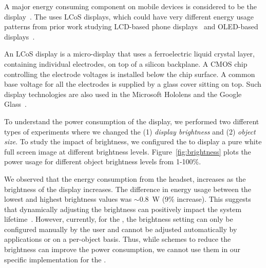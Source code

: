 
A major energy consuming component on mobile devices is considered to be the
display~\cite{187123,Anand:2011}. The {\mlo} uses LCoS displays, which could have very different energy usage patterns from prior work studying LCD-based phone displays~\cite{focus} and OLED-based displays~\cite{focus,focusVR}.

An LCoS display is a micro-display that uses a ferroelectric liquid crystal 
layer, containing individual electrodes, on top of a silicon backplane. A CMOS chip controlling the electrode voltages is installed below the chip surface. A common base voltage for all the electrodes is supplied by a glass cover sitting on top. Such display technologies are also used in the Microsoft Hololens and the Google Glass~\cite{LiKamWa14GGlass}. 

%

To understand the power consumption of the display, we performed two different types of experiments where we changed the
(1) \textit{display brightness} and (2) \textit{object size}. To study the impact of brightness, we configured the {\mlo} to display a pure white full screen image at different brightness levels. Figure~\ref{fig:brightness} plots the power usage for different object brightness levels from 1-100\%. 

We observed that the energy consumption from the headset, increases as the brightness of the display increases. The 
difference in energy usage between the lowest and highest brightness values was $\sim$0.8~W (9\% increase). This suggests that dynamically adjusting
the brightness can positively impact the system lifetime~\cite{focus}. 
However, currently, for the {\mlo}, the brightness setting can only be configured 
manually by the user and cannot be adjusted automatically by applications or on a per-object basis. Thus, while schemes to reduce the brightness can improve the power consumption, we cannot use them in our specific implementation for the {\mlo}.

%
%



